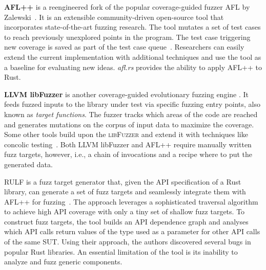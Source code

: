 \documentclass[paper=a4,%
  twoside,%
  BCOR4mm,%
  abstract=true,%
  toc=bibliography,%
  chapterprefix=true,%
  toc=bibliographynumbered,%
  open=right,%
  english,%
  pagesize=pdftex]{scrreprt}
\begin{document}
\textbf{AFL++} is a reengineered fork of the popular coverage-guided fuzzer \textsc{AFL} by Zalewski~\cite{Zalewski2014}. It is an extensible community-driven open-source tool that incorporates state-of-the-art fuzzing research. The tool mutates a set of test cases to reach previously unexplored points in the program. The test case triggering new coverage is saved as part of the test case queue~\cite{Fioraldi2020}. Researchers can easily extend the current implementation with additional techniques and use the tool as a baseline for evaluating new ideas. \emph{afl.rs} provides the ability to apply \textsc{AFL++} to Rust.

\textbf{LLVM libFuzzer} is another coverage-guided evolutionary fuzzing engine . It feeds fuzzed inputs to the library under test via specific fuzzing entry points, also known as \emph{target functions}. The fuzzer tracks which areas of the code are reached and generates mutations on the corpus of input data to maximize the coverage. Some other tools build upon the \textsc{libFuzzer} and extend it with techniques like concolic testing~\cite{Rocha2020,Le2019}. Both LLVM libFuzzer and \textsc{AFL++} require manually written fuzz targets, however, i.e., a chain of invocations and a recipe where to put the generated data.

\textsc{RULF} is a fuzz target generator that, given the \ac{API} specification of a Rust library, can generate a set of fuzz targets and seamlessly integrate them with \textsc{AFL++} for fuzzing~\cite{Jiang2021}. The approach leverages a sophisticated traversal algorithm to achieve high \ac{API} coverage with only a tiny set of shallow fuzz targets. To construct fuzz targets, the tool builds an \ac{API} dependence graph and analyses which \ac{API} calls return values of the type used as a parameter for other \ac{API} calls of the same \ac{SUT}. Using their approach, the authors discovered several bugs in popular Rust libraries. An essential limitation of the tool is its inability to analyze and fuzz generic components.
\end{document}
